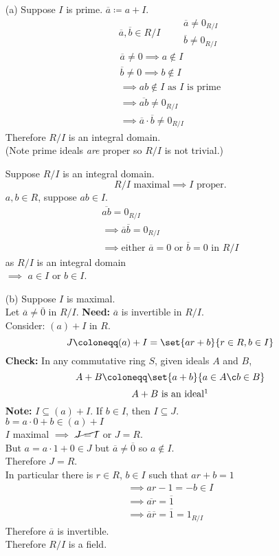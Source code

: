 \begin{enumerate}
\item[(a)] Suppose $I$ is prime.  $\overline a\coloneqq a + I$.
\[ \overline a, \overline b \in R/I \qquad \begin{gathered}\overline a\neq0_{R/I}\\\overline b\neq0_{R/I}\end{gathered} \]
\begin{gather*}
\overline a \neq 0 \implies a \notin I \\
\overline b \neq 0 \implies b \notin I \\
\implies ab \notin I \text{ as $I$ is prime} \\
\implies \overline{ab}\neq0_{R/I} \\
\implies \overline a\cdot\overline b\neq0_{R/I}
\end{gather*}
Therefore $R/I$ is an integral domain. \\
(Note prime ideals \emph{are} proper so $R/I$ is not trivial.)

Suppose $R/I$ is an integral domain. \\
\[ \text{$R/I$ maximal} \implies \text{$I$ proper} . \]
$a,b\in R$, suppose $ab\in I$.
\begin{gather*}
\overline{ab} = 0_{R/I} \\
\implies\overline{a}\overline{b} = 0_{R/I} \\
\implies\text{either $\overline a=0$ or $\overline b=0$ in $R/I$}
\end{gather*}
as $R/I$ is an integral domain \\
$\implies$ $a\in I$ or $b\in I$.
\item[(b)] Suppose $I$ is maximal. \\
Let $\overline a\neq\overline 0$ in $R/I$.  \textbf{Need:} $\overline a$ is invertible in $R/I$. \\
Consider: $(a)+I$ in \emph{$R$}.
\[ J \coloneqq (a) + I = \set{ar+b}{r\in R, b\in I} \]
\textbf{Check:} In any commutative ring $S$, given ideals $A$ and $B$,
\[ A + B \coloneqq \set{a+b}{a\in A\c b\in B} \]
\[ A + B \text{ is an ideal}\footnotemark \]%
\textbf{Note:} $I\subseteq(a)+I$.  If $b\in I$, then $I\subseteq J$. \\
$b=a\cdot0+b\in(a)+I$ \\
$I$ maximal $\implies$ $\cancel{J=I}$ or $J=R$. \\
But $a=a\cdot1+0\in J$ but $\overline a\neq\overline0$ so $a\notin I$. \\
Therefore $J=R$. \\
In particular there is $r\in R$, $b\in I$ such that $ar+b=1$
\begin{gather*}
\implies ar-1 = -b \in I \\
\implies \overline{ar} = \overline1 \\
\implies \overline a \overline r = \overline1 = 1_{R/I}
\end{gather*}
Therefore $\overline a$ is invertible. \\
Therefore $R/I$ is a field.


\end{enumerate}
